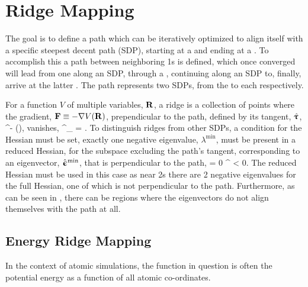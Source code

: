 \section{Ridge Mapping}
The goal is to define a path which can be iteratively optimized to align itself with a specific steepest decent path (SDP),
starting at a  and ending at a .
To accomplish this a path between neighboring \sap1s is defined,
which once converged will lead from one  along an SDP,
through a ,
continuing along an SDP to, finally, arrive at the latter .
The path represents two SDPs, from the  to each  respectively.

For a function $V$ of multiple variables, ${\mathrm{\mathbf{\bm{R}}}}$, a ridge is a collection of points where the gradient, ${\mathrm{\mathbf{\bm{F}}}} \equiv -\nabla V({\mathrm{\mathbf{\bm{R}}}})$, prependicular to the path, defined by its tangent, $\hat{{\mathrm{\mathbf{\bm{\uptau}}}}}$,
\vF^\perp \equiv \vF - (\vF \cdot \uvt)\uvt,
\eeq
vanishes,
\vF^\perp_ = .
\eeq
To distinguish ridges from other SDPs,
a condition for the Hessian must be set,
exactly one negative eigenvalue, $\lambda^\text{min}$, must be present in a reduced Hessian, for the subspace excluding the path's tangent,
corresponding to an eigenvector, $\hat{{\mathrm{\mathbf{\bm{\upepsilon}}}}}^\text{min}$, that is perpendicular to the path,
\uvm \cdot \uvt = 0 \quad {} \quad \lambda^ < 0.
\eeq
The reduced Hessian must be used in this case as near \sap2s there are 2 negative eigenvalues for the full Hessian, one of which is not perpendicular to the path.
Furthermore, as can be seen in , there can be regions where the eigenvectors do not align themselves with the path at all.



\incomplete

\subsection{Energy Ridge Mapping}
In the context of atomic simulations, the function in question is often the potential energy as a function of all atomic co-ordinates.

\incomplete

